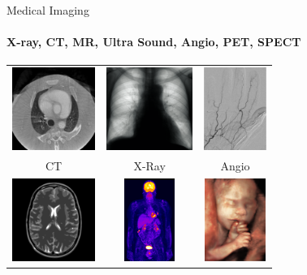 \begin{frame}[c]{Medical Imaging}
    \framesubtitle{X-ray, CT, MR, Ultra Sound, Angio, PET, SPECT}
    \centering{}
    \begin{tabular}{ccc}
        \includegraphics[height=2.7cm]{../02_image_processing/img/m1000-1000HU.png}    &
        \includegraphics[height=2.7cm]{../06_x-ray/Siemens_Images/150_7.png}           &
        \includegraphics[height=2.7cm]{../06_x-ray/images/dsa_diff.pdf}                                          \\
        CT                                                                             & X-Ray & Angio           \\[0.2cm]
        \includegraphics[height=2.7cm]{images/parallel_full.png}      &
        \includegraphics[height=2.7cm]{images/appB.png} &
        \includegraphics[height=2.7cm]{images/SH_US_34572_12.jpg}                       \\

\end{tabular}
\end{frame}
